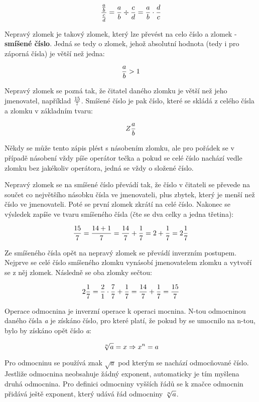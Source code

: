 $$ {{a \over b} \over {c \over d}} = {a \over b} \div {c \over d} = {a \over b} \cdot {d \over c} $$


Nepravý zlomek je takový zlomek, který lze převést na celo číslo a zlomek - {\bf smíšené číslo}. Jedná se tedy o zlomek, jehož absolutní hodnota (tedy i pro záporná čísla) je větší než jedna:

$$ {a\over b} > 1 $$

Nepravý zlomek se pozná tak, že čitatel daného zlomku je větší než jeho jmenovatel, například $15 \over 7$. Smíšené číslo je pak číslo, které se skládá z celého čísla a zlomku v základním tvaru:

$$ Z {a \over b} $$

Někdy se může tento zápis plést s násobením zlomku, ale pro pořádek se v případě násobení vždy píše operátor tečka a pokud se celé číslo nachází vedle zlomku bez jakékoliv operátora, jedná se vždy o složené číslo.

Nepravý zlomek se na smíšené číslo převádí tak, že číslo v čitateli se převede na součet co největšího násobku čísla ve jmenovateli, plus zbytek, který je menší než číslo ve jmenovateli. Poté se první zlomek zkrátí na celé číslo. Nakonec se výsledek zapíše ve tvaru smíšeného čísla (čte se dva celky a jedna třetina):

$$ {15 \over 7} = {14 + 1 \over 7} = {14 \over 7} + {1\over 7} = 2 + {1\over 7} = 2{1\over 7} $$

Ze smíšeného čísla opět na nepravý zlomek se převádí inverzním postupem. Nejprve se celé číslo smíšeného zlomku vynásobí jmenovatelem zlomku a vytvoří se z něj zlomek. Následně se oba zlomky sečtou:

$$ 2{1\over 7} = {2\over 1}\cdot {7\over 7} + {1\over 7} = {14 \over 7} + {1\over 7} = {15\over 7} $$


Operace odmocnina je inverzní operace k operaci mocnina. N-tou odmocninou daného čísla {\it a} je získáno číslo, pro které platí, že pokud by se umocnilo na n-tou, bylo by získáno opět číslo {\it a}:

$$ \root n\of{a} = x \Rightarrow x^n = a $$

Pro odmocninu se používá znak $\sqrt {a}$ pod kterým se nachází odmocňované číslo. Jestliže odmocnina neobsahuje žádný exponent, automaticky je tím myšlena druhá odmocnina. Pro definici odmocniny vyšších řádů se k značce odmocnin přidává ještě exponent, který udává řád odmocniny $\root n\of{a}$.

